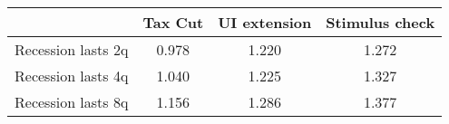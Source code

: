 \begin{tabular}{@{}lccc@{}}
\toprule
& Tax Cut    & UI extension    & Stimulus check    \\  \midrule
Recession lasts 2q &0.978  & 1.220  & 1.272     \\
Recession lasts 4q &1.040  & 1.225  & 1.327     \\
Recession lasts 8q &1.156  & 1.286  & 1.377     \\
\end{tabular}
